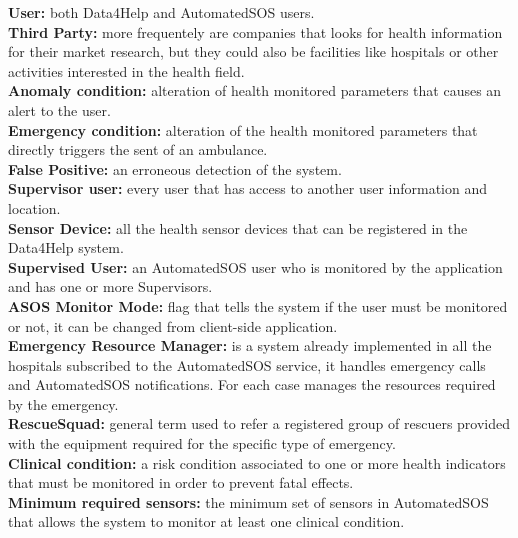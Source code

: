 \begin{flushleft}
{}
{}
\raggedright
\textbf{User:} both Data4Help and AutomatedSOS users.\\
\textbf{Third Party:} more frequentely are companies that looks for health information for their market research, but they could also be facilities like hospitals or other activities interested in the health field.  \\ 
\textbf{Anomaly condition:} alteration of health monitored parameters that causes an alert to the user.\\
\textbf{Emergency condition:} alteration of the health monitored parameters that directly triggers the sent of an ambulance.\\
\textbf{False Positive:} an erroneous detection of the system.\\
\textbf{Supervisor user:} every user that has access to another user information and location. \\
\textbf{Sensor Device:} all the health sensor devices that can be registered in the Data4Help system.\\
\textbf{Supervised User:} an AutomatedSOS user who is monitored by the application and has one or more Supervisors. \\
\textbf{ASOS Monitor Mode:} flag that tells the system if the user must be monitored or not, it can be changed from client-side application.\\
\textbf{Emergency Resource Manager:} is a system already implemented in all the hospitals subscribed to the AutomatedSOS service, it handles emergency calls and AutomatedSOS notifications. For each case manages the resources required by the emergency. \\
\textbf{RescueSquad:} general term used to refer a registered group of rescuers provided with the equipment required for the specific type of emergency. \\
\textbf{Clinical condition:} a risk condition associated to one or more health indicators that must be monitored in order to prevent fatal effects. \\
\textbf{Minimum required sensors:} the minimum set of sensors in AutomatedSOS that allows the system to monitor at least one clinical condition. \\

\end{flushleft}
